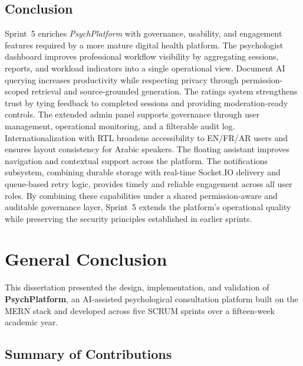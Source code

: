 \documentclass[a4paper,12pt]{report}
\begin{document}
\section{Conclusion}
\label{sec:sprint5-conclusion}

Sprint~5 enriches \emph{PsychPlatform} with governance, usability, and engagement features
required by a more mature digital health platform. The psychologist dashboard improves
professional workflow visibility by aggregating sessions, reports, and workload indicators
into a single operational view. Document AI querying increases productivity while respecting
privacy through permission-scoped retrieval and source-grounded generation. The ratings
system strengthens trust by tying feedback to completed sessions and providing
moderation-ready controls. The extended admin panel supports governance through user
management, operational monitoring, and a filterable audit log. Internationalization with RTL
broadens accessibility to EN/FR/AR users and ensures layout consistency for Arabic speakers.
The floating assistant improves navigation and contextual support across the platform. The
notifications subsystem, combining durable storage with real-time Socket.IO delivery and
queue-based retry logic, provides timely and reliable engagement across all user roles. By
combining these capabilities under a shared permission-aware and auditable governance layer,
Sprint~5 extends the platform's operational quality while preserving the security principles
established in earlier sprints.


\chapter*{General Conclusion}
{}

\vspace{0.5cm}

This dissertation presented the design, implementation, and validation of
\textbf{PsychPlatform}, an AI-assisted psychological consultation platform
built on the MERN stack and developed across five SCRUM sprints over a
fifteen-week academic year.

\section*{Summary of Contributions}
{}
\end{document}
